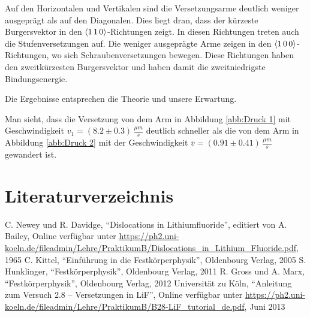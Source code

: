 \documentclass[12pt,a4paper]{scrartcl}
\numberwithin{equation}{section} %
\begin{document}
Auf den Horizontalen und Vertikalen sind die Versetzungsarme deutlich
weniger ausgeprägt als auf den Diagonalen. Dies liegt dran, dass der
kürzeste Burgersvektor in den $\expval{1\,1\,0}$-Richtungen zeigt. In
diesen Richtungen treten auch die Stufenversetzungen auf. Die weniger
ausgeprägte Arme zeigen in den $\expval{1\,0\,0}$-Richtungen, wo sich
Schraubenversetzungen bewegen. Diese Richtungen haben den zweitkürzesten
Burgersvektor und haben damit die zweitniedrigste Bindungsenergie.

Die Ergebnisse entsprechen die Theorie und unsere Erwartung.

Man sieht, dass die Versetzung von dem Arm in Abbildung \ref{abb:Druck 1} mit
Geschwindigkeit $v_1=(8.2 \pm 0.3) \,\frac{\mu m}{s}$ deutlich
schneller als die von dem Arm in Abbildung \ref{abb:Druck 2} mit der
Geschwindigkeit $\bar{v}=(0.91 \pm 0.41) \,\frac{\mu m}{s}$ gewandert
ist.

\clearpage
\hypertarget{literaturverzeichnis}{%
	\section{Literaturverzeichnis}\label{literaturverzeichnis}}
\begin{thebibliography}{9}
	 C. Newey und R. Davidge, ``Dislocations in Lithiumfluoride'', editiert von
	A. Bailey, Online verfügbar unter
	\url{https://ph2.uni-koeln.de/fileadmin/Lehre/PraktikumB/Dislocations_in_Lithium_Fluoride.pdf}, 1965
	C. Kittel, ``Einführung in die Festkörperphysik'', Oldenbourg Verlag, 2005
	S. Hunklinger, ``Festkörperphysik'', Oldenbourg Verlag, 2011
	R. Gross und A. Marx, ``Festkörperphysik'', Oldenbourg Verlag, 2012
	Universität zu Köln, ``Anleitung zum Versuch 2.8 -- Versetzungen in
	LiF'', Online verfügbar unter
	\url{https://ph2.uni-koeln.de/fileadmin/Lehre/PraktikumB/B28-LiF_tutorial_de.pdf}, Juni 2013
\end{thebibliography}
\end{document}
